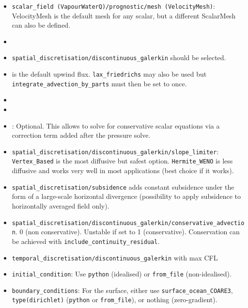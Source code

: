 \documentclass[10pt,a4paper]{article}
\begin{document}
\begin{itemize}
\begin{itemize}
\item \texttt{scalar\_field (VapourWaterQ)/prognostic/mesh (VelocityMesh)}: VelocityMesh is the default mesh for any scalar, but a different ScalarMesh can also be defined.
\item \texttt{}
\item \texttt{spatial\_discretisation/discontinuous\_galerkin} should be selected.
\item \texttt{} is the default upwind flux. \texttt{lax\_friedrichs} may also be used but \texttt{integrate\_advection\_by\_parts} must then be set to once.
\item \texttt{}
\item \texttt{}
\item \texttt{}: Optional. This allows to solve for conservative scalar equations via a correction term added after the pressure solve. 
\item \texttt{spatial\_discretisation/discontinuous\_galerkin/slope\_limiter}: \texttt{Vertex\_Based} is the most diffusive but safest option. \texttt{Hermite\_WENO} is less diffusive and works very well in most applications (best choice if it works).
\item \texttt{spatial\_discretisation/subsidence} adds constant subsidence under the form of a large-scale horizontal divergence (possibility to apply subsidence to horizontally averaged field only).
\item \texttt{spatial\_discretisation/discontinuous\_galerkin/conservative\_advection}. 0 (non conservative). Unstable if set to 1 (conservative). Conservation can be achieved with \texttt{include\_continuity\_residual}.
\item \texttt{temporal\_discretisation/discontinuous\_galerkin} with max CFL
\item \texttt{initial\_condition}: Use \texttt{python} (idealised) or \texttt{from\_file} (non-idealised).
\item \texttt{boundary\_conditions}: For the surface, either use \texttt{surface\_ocean\_COARE3}, \texttt{type(dirichlet)} (\texttt{python} or \texttt{from\_file}), or nothing (zero-gradient).

\end{itemize}
\end{itemize}
\end{document}
